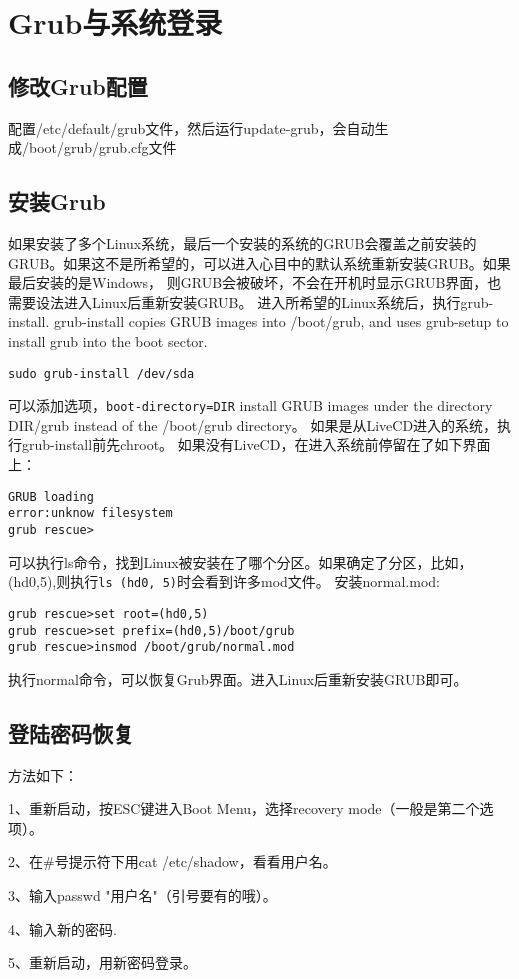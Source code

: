 \section{Grub与系统登录}
\subsection{修改Grub配置}
配置/etc/default/grub文件，然后运行update-grub，会自动生成/boot/grub/grub.cfg文件
\subsection{安装Grub}
如果安装了多个Linux系统，最后一个安装的系统的GRUB会覆盖之前安装的GRUB。如果这不是所希望的，可以进入心目中的默认系统重新安装GRUB。如果最后安装的是Windows，
则GRUB会被破坏，不会在开机时显示GRUB界面，也需要设法进入Linux后重新安装GRUB。
进入所希望的Linux系统后，执行grub-install. grub-install copies GRUB images into /boot/grub, and uses grub-setup to install grub into the boot sector.
\begin{verbatim}
sudo grub-install /dev/sda
\end{verbatim}
可以添加选项，\verb+boot-directory=DIR+
install GRUB images under the directory DIR/grub instead of the /boot/grub directory。
如果是从LiveCD进入的系统，执行grub-install前先chroot。
如果没有LiveCD，在进入系统前停留在了如下界面上：
\begin{verbatim}
GRUB loading
error:unknow filesystem
grub rescue>
\end{verbatim}
可以执行ls命令，找到Linux被安装在了哪个分区。如果确定了分区，比如，(hd0,5),则执行\verb+ls (hd0, 5)+时会看到许多mod文件。
安装normal.mod:
\begin{verbatim}
grub rescue>set root=(hd0,5)
grub rescue>set prefix=(hd0,5)/boot/grub
grub rescue>insmod /boot/grub/normal.mod
\end{verbatim}
执行normal命令，可以恢复Grub界面。进入Linux后重新安装GRUB即可。


\subsection{登陆密码恢复}
方法如下：

1、重新启动，按ESC键进入Boot Menu，选择recovery mode（一般是第二个选项）。

2、在\#号提示符下用cat /etc/shadow，看看用户名。

3、输入passwd "用户名"（引号要有的哦）。

4、输入新的密码.

5、重新启动，用新密码登录。 
